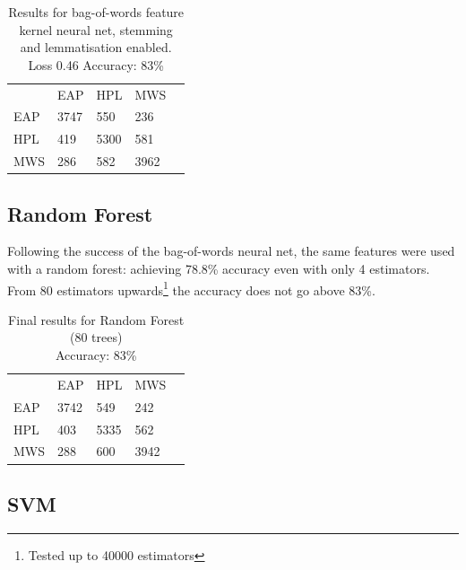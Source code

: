 \begin{table}[h]
\centering
\begin{tabular}{m{1cm}|m{1cm}|m{1cm}|m{1cm}|m{0cm}}
\multicolumn{1}{m{1cm}}{} & \multicolumn{1}{m{1cm}}{EAP} & \multicolumn{1}{m{1cm}}{HPL} & \multicolumn{1}{m{1cm}}{MWS} &\\[5pt]
\cline{2-4}
EAP & 3747 & 550 & 236 & \\[5pt]
\cline{2-4}
HPL & 419 & 5300 & 581 & \\[5pt]
\cline{2-4}
MWS & 286 & 582 & 3962 & \\[5pt]
\cline{2-4}
\end{tabular}
\caption{Results for bag-of-words feature kernel neural net, stemming and lemmatisation enabled.\\Loss 0.46 Accuracy: 83\% }
\label{tab:bow_nn_res}
\end{table}

  \subsection{Random Forest}
  \label{sec:forest_extension}

  Following the success of the bag-of-words neural net, the same features were
  used with a random forest: achieving 78.8\% accuracy even with only 4
  estimators. From 80 estimators upwards\footnote{Tested up to 40000 estimators}
  the accuracy does not go above 83\%.

  \begin{table}[h]
\centering
\begin{tabular}{m{1cm}|m{1cm}|m{1cm}|m{1cm}|m{0cm}}
\multicolumn{1}{m{1cm}}{} & \multicolumn{1}{m{1cm}}{EAP} & \multicolumn{1}{m{1cm}}{HPL} & \multicolumn{1}{m{1cm}}{MWS} &\\[5pt]
\cline{2-4}
EAP & 3742 & 549 & 242 & \\[5pt]
\cline{2-4}
HPL & 403 & 5335 & 562 & \\[5pt]
\cline{2-4}
MWS & 288 & 600 & 3942 & \\[5pt]
\cline{2-4}
\end{tabular}
\caption{Final results for Random Forest (80 trees)\\Accuracy: 83\% }
\label{tab:forest_res}
\end{table}

  \subsection{SVM}
  \label{sec:svm_extension}

